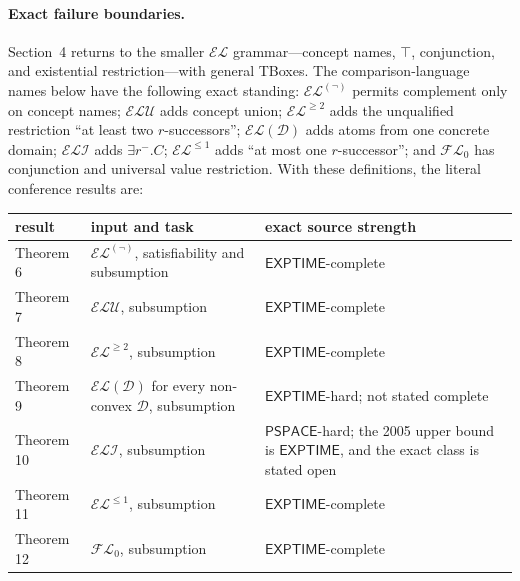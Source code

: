 \paragraph{Exact failure boundaries.}
Section~4 returns to the smaller \(\mathcal{EL}\) grammar---concept names,
\(\top\), conjunction, and existential restriction---with general TBoxes.
The comparison-language names below have the following exact standing:
\(\mathcal{EL}^{(\neg)}\) permits complement only on concept names;
\(\mathcal{ELU}\) adds concept union; \(\mathcal{EL}^{\geq2}\) adds the
unqualified restriction ``at least two \(r\)-successors'';
\(\mathcal{EL}(\mathcal D)\) adds atoms from one concrete domain;
\(\mathcal{ELI}\) adds \(\exists r^{-}.C\);
\(\mathcal{EL}^{\leq1}\) adds ``at most one \(r\)-successor''; and
\(\mathcal{FL}_0\) has conjunction and universal value restriction.  With
these definitions, the literal conference results are:
\begin{center}
\small
\begin{tabularx}{\textwidth}{@{}l X X@{}}
\toprule
result & input and task & exact source strength\\
\midrule
Theorem 6 & \(\mathcal{EL}^{(\neg)}\), satisfiability and subsumption &
\(\mathsf{EXPTIME}\)-complete\\
Theorem 7 & \(\mathcal{ELU}\), subsumption &
\(\mathsf{EXPTIME}\)-complete\\
Theorem 8 & \(\mathcal{EL}^{\geq2}\), subsumption &
\(\mathsf{EXPTIME}\)-complete\\
Theorem 9 & \(\mathcal{EL}(\mathcal D)\) for every non-convex
\(\mathcal D\), subsumption & \(\mathsf{EXPTIME}\)-hard; not stated complete\\
Theorem 10 & \(\mathcal{ELI}\), subsumption & \(\mathsf{PSPACE}\)-hard;
the 2005 upper bound is \(\mathsf{EXPTIME}\), and the exact class is stated
open\\
Theorem 11 & \(\mathcal{EL}^{\leq1}\), subsumption &
\(\mathsf{EXPTIME}\)-complete\\
Theorem 12 & \(\mathcal{FL}_0\), subsumption &
\(\mathsf{EXPTIME}\)-complete\\
\bottomrule
\end{tabularx}
\end{center}

